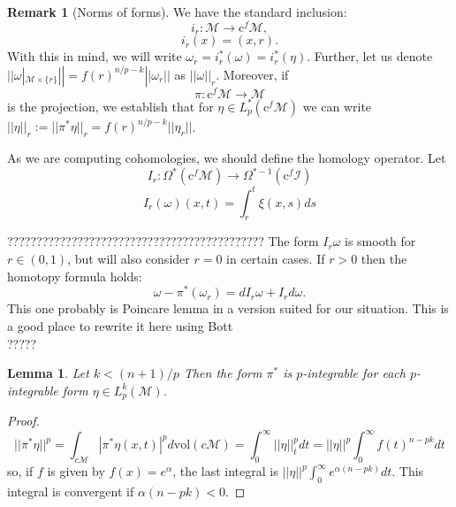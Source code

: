 \documentclass[licencjacka]{pracamgr}
\theoremstyle{definition}
\theoremstyle{definition}
\newtheorem{remark}{Remark}[section]
\theoremstyle{plain}
\newtheorem{lemma}{Lemma}[section]
\theoremstyle{plain}
\begin{document}

\begin{remark}[Norms of forms]
We have the standard inclusion:
\[
    i_r: \mathcal{M} \rightarrow \mathrm{c}^f \mathcal{M},
\]
\[
    i_r(x) = (x, r).
\]
With this in mind, we will write $\omega_r = i_r^\ast(\omega) =
i_r^\ast(\eta)$. Further, let us
 denote $|| \omega |_{\mathcal{M} \times
  \{r\}} || = f(r)^{n/p - k} ||\omega_r||$ as $|| \omega ||_r $. Moreover, if
\[
    \pi:\mathrm{c}^f \mathcal{M} \rightarrow \mathcal{M}
\]
is the projection, we establish that for $\eta \in L^\ast_p(\mathrm{c}^f\mathcal{M})$
we can write $||\eta||_r := ||\pi^\ast\eta||_r = f(r)^{n/p - k} ||\eta_r||$.
\end{remark}



As we are computing cohomologies, we should define the homology operator. Let
\[
  I_r: \Omega^\ast( \mathrm{c}^f \mathcal{M} ) \rightarrow
  \Omega^{\ast-1}(\mathrm{c}^f \mathcal{I} ) 
\]
\[
    I_r(\omega)(x, t) = \int_r^t \xi(x, s) ds
\]

????????????????????????????????????????????
The form $I_r\omega$ is smooth for $r \in (0,1)$, but will also consider
$r=0$ in certain cases. If $r>0$ then the homotopy formula holds:
\[
    \omega - \pi^\ast(\omega_r) = d I_r\omega + I_rd\omega.
\] 
This one probably is Poincare lemma in a version suited for our situation.
This is a good place to rewrite it here using Bott \\ 
????? \\

\begin{lemma}
Let $k < (n+1)/p $ Then the form $\pi^\ast$ is $p$-integrable for each 
$p$-integrable form $\eta \in L^k_p(\mathcal{M})$. 
\end{lemma}
\begin{proof}
\[
    ||\pi^\ast \eta ||^p = 
    \int_{c \mathcal{M}} |\pi^\ast \eta(x,t)|^p d \mathrm{vol}(c\mathcal{M}) = 
    \int_0^\infty ||\eta||_t^p dt = ||\eta||^p \int_0^\infty f(t)^{n-pk} dt
\]
so, if $f$ is given by $f(x) = e^\alpha$, the last integral is  
$ ||\eta||^p \int_0^\infty e^{\alpha (n-pk)} dt$. This integral is convergent
if $\alpha (n - pk) < 0$.
\end{proof}
\end{document}
